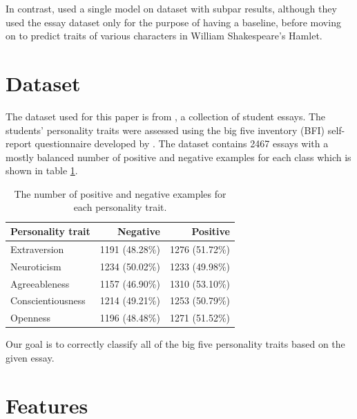 \documentclass[10pt, a4paper]{article}
\begin{document}
In contrast, \citep{pizzolli-strapparava-2019-personality} used a single model on \citep{pennebaker} dataset with subpar results, although they used the essay dataset only for the purpose of having a baseline, before moving on to predict traits of various characters in William Shakespeare's Hamlet.

\section{Dataset}

The dataset used for this paper is from \citep{pennebaker}, a collection of student essays.
The students' personality traits were assessed using the big five inventory (BFI) self-report questionnaire developed by \citep{john1991big}.
The dataset contains 2467  essays with a mostly balanced number of positive and negative examples for each class which is shown in table \ref{positive negative examples}.

\begin{table}[H]
	\centering
	\caption{The number of positive and negative examples for each personality trait.}
	\begin{tabular}{lrr}
		\toprule
		Personality trait & Negative & Positive \\ \midrule
		Extraversion                                  & 1191 (48.28\%)                         & 1276 (51.72\%)                         \\
		Neuroticism                                  & 1234 (50.02\%)                         & 1233 (49.98\%)                         \\
		Agreeableness                                  & 1157 (46.90\%)                         & 1310 (53.10\%)                         \\
		Conscientiousness                                  & 1214 (49.21\%)                         & 1253 (50.79\%)                         \\
		Openness                                  & 1196 (48.48\%)                         & 1271 (51.52\%)                         \\ \bottomrule
	\end{tabular}
	\label{positive negative examples}
\end{table}

Our goal is to correctly classify all of the big five personality traits based on the given essay.

\section{Features}
\end{document}
